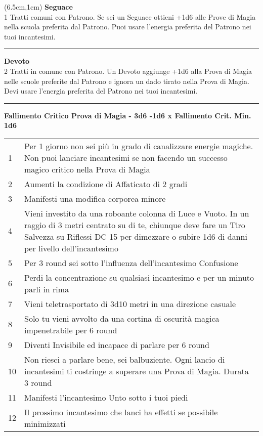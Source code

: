 \documentclass[a4paper,12 pt,openany]{book}
\newcommand{\riga}{\rule{\textwidth}{0.4pt}}
\begin{document}
\begin{textblock*}{13.5cm}(6.5cm,1cm) %
\textbf{Seguace}\\
1 Tratti comuni con Patrono. Se sei un Seguace ottieni +1d6 alle Prove di Magia nella scuola preferita dal Patrono. Puoi usare l'energia preferita del Patrono nei tuoi incantesimi.\\

\riga

\textbf{Devoto}\\
2 Tratti in comune con Patrono. Un Devoto aggiunge +1d6 alla Prova di Magia nelle scuole preferite dal Patrono e ignora un dado tirato nella Prova di Magia. Devi usare l'energia preferita del Patrono nei tuoi incantesimi.

\riga

\textbf{Fallimento Critico Prova di Magia - 3d6 -1d6 x Fallimento Crit. Min. 1d6}
\begin{tabularx}{0.95\textwidth}{lX}
1 & Per 1 giorno non sei più in grado di canalizzare energie magiche. Non puoi lanciare incantesimi se non facendo un successo magico critico nella Prova di Magia\\
2 & Aumenti la condizione di Affaticato di 2 gradi\\
3 & Manifesti una modifica corporea minore\\
4 & Vieni investito da una roboante colonna di Luce e Vuoto. In un raggio di 3 metri centrato su di te, chiunque deve fare un Tiro Salvezza su Riflessi DC 15 per dimezzare o subire 1d6 di danni per livello dell'incantesimo\\
5 & Per 3 round sei sotto l'influenza dell'incantesimo Confusione\\
6 & Perdi la concentrazione su qualsiasi incantesimo e per un minuto parli in rima\\
7 & Vieni teletrasportato di 3d10 metri in una direzione casuale\\
8 & Solo tu vieni avvolto da una cortina di oscurità magica impenetrabile per 6 round\\
9 & Diventi Invisibile ed incapace di parlare per 6 round\\
10 & Non riesci a parlare bene, sei balbuziente. Ogni lancio di incantesimi ti costringe a superare una Prova di Magia. Durata 3 round\\
11 & Manifesti l'incantesimo Unto sotto i tuoi piedi\\
12 & Il prossimo incantesimo che lanci ha effetti se possibile minimizzati\\

\end{tabularx}
\end{textblock*}
\end{document}

